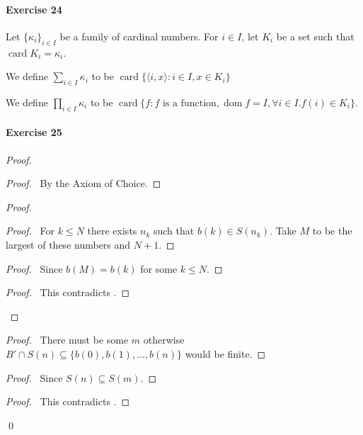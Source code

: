 \documentclass{report}
\newcommand{\card}{\ensuremath{\operatorname{card}}}
\newcommand{\dom}{\ensuremath{\operatorname{dom}}}
\begin{document}
    \paragraph{Exercise 24}
    Let $\{ \kappa_i \}_{i \in I}$ be a family of cardinal numbers. For $i \in I$, let $K_i$
    be a set such that $\card K_i = \kappa_i$.

    We define $\sum_{i \in I} \kappa_i$ to be $\card \{ \langle i, x \rangle : i \in I, x \in K_i \}$

    We define $\prod_{i \in I} \kappa_i$ to be $\card \{ f : f \text{ is a function},
    \dom f = I, \forall i \in I. f(i) \in K_i \}$.

    \paragraph{Exercise 25}
    \begin{proof}
        \pf
        \begin{proof}
            \pf\ By the Axiom of Choice.
        \end{proof}
        \begin{proof}
            \begin{proof}
                \pf\ For $k \leq N$ there exists $n_k$ such that $b(k) \in S(n_k)$. Take $M$ to be the largest of these
                numbers and $N + 1$.
            \end{proof}
            \begin{proof}
                \pf\ Since $b(M) = b(k)$ for some $k \leq N$.
            \end{proof}
            \qedstep
            \begin{proof}
                \pf\ This contradicts .
            \end{proof}
        \end{proof}
        \begin{proof}
            \pf\ There must be some $m$ otherwise $B' \cap S(n) \subseteq \{ b(0), b(1), \ldots, b(n) \}$
            would be finite.
        \end{proof}
        \begin{proof}
            \pf\ Since $S(n) \subseteq S(m)$.
        \end{proof}
        \qedstep
        \begin{proof}
            \pf\ This contradicts .
        \end{proof}
        \qed
    \end{proof}
\end{document}
